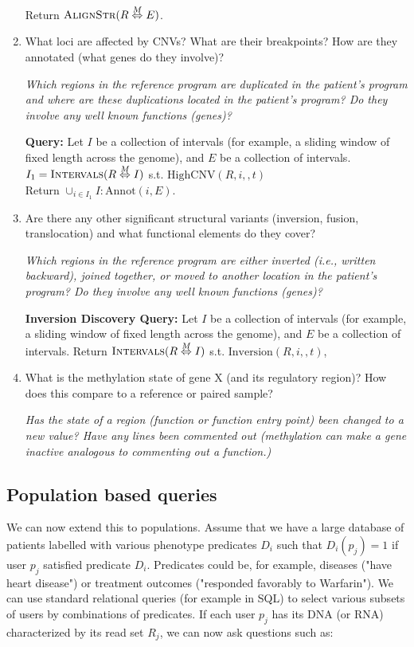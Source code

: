 \documentclass[10pt,fullpage]{article}
\def\ensuretext{\textrm}
\newcommand{\AlignStr}{\ensuretext{{\sc AlignStr}}}
\newcommand{\Intervals}{\ensuretext{{\sc Intervals}}}
\newcommand{\MapRel}{\ensuremath{\stackrel{M}{\Leftrightarrow}}}
\begin{document}
\begin{enumerate}
Return $\AlignStr(R\MapRel E)$.

\item What loci are affected by CNVs?  What are their breakpoints?  How are they 
annotated (what genes do they involve)? 


{\em Which regions in the reference program are duplicated in the
patient's program and where are these duplications located in the 
patient's program?  Do they involve any well known functions (genes)?}

{\bf Query:} Let $I$ be a collection of intervals (for example, a
sliding window of fixed length across the genome), and $E$ be a
collection of intervals.
$I_1=\Intervals(R\MapRel I)$ s.t. $\mbox{HighCNV}(R,i,,t)$\\
Return $\cup_{i\in I_1} I:\mbox{Annot}(i,E)$.


\item Are there any other significant structural variants 
(inversion, fusion, translocation) and what functional elements 
do they cover? 



{\em Which regions in the reference program are either inverted 
(i.e., written backward), joined together, or moved to another
location in the patient's program?  Do they involve any well known 
functions (genes)?}

{\bf Inversion Discovery Query:} Let $I$ be a collection of intervals (for example, a
sliding window of fixed length across the genome), and $E$ be a
collection of intervals.  Return
$\Intervals(R\MapRel I)$ s.t. $\mbox{Inversion}(R,i,,t)$,

\item What is the methylation state of gene X (and its regulatory region)?  
How does this compare to a reference or paired sample? 

{\em Has the state of a region (function or function entry point) 
been changed to a new value?  Have any lines been commented out
(methylation can make a gene inactive analogous to commenting out
a function.) }
\end{enumerate}


\subsection{Population based queries}
We can now extend this to populations.  Assume that we 
have a large database of patients labelled with various 
phenotype
predicates $D_i$ such that $D_i(p_j)= 1$ if user $p_j$ 
satisfied predicate $D_i$.  Predicates could be, for example,
diseases ("have heart disease") or treatment outcomes 
("responded favorably to Warfarin").   We can use
standard relational queries (for example in SQL) to select
various subsets of users by combinations of predicates.
If each user $p_j$ has its DNA (or RNA) characterized by
its read set $R_j$, we can now ask questions such as:
\end{document}
